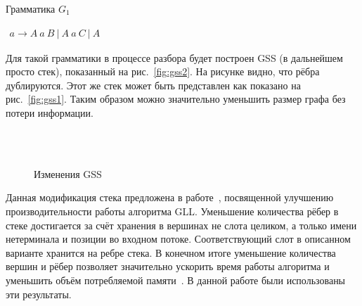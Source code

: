\begin{listing}
\caption{Грамматика $G_1$}
\label{grmG1}
\centering
$\begin{array}{rl}
a \rightarrow A \ a \ B \ | \ A \ a \ C \ | \ A
\end{array}$

\end{listing}
Для такой грамматики в процессе разбора будет построен GSS (в дальнейшем просто стек), показанный на рис.~\ref{fig:gss2}. На рисунке видно, что рёбра дублируются. Этот же стек может быть представлен как показано на рис.~\ref{fig:gss1}. Таким образом можно значительно уменьшить размер графа без потери информации. 
\begin{figure}
 \centering
    ~\\~
 \caption{Изменения GSS}
\end{figure}

Данная модификация стека предложена в работе~\cite{Afroozeh2015}, посвященной улучшению производительности работы алгоритма GLL. Уменьшение количества рёбер в стеке достигается за счёт хранения в вершинах не слота целиком, а только имени нетерминала и позиции во входном потоке. Соответствующий слот в описанном варианте хранится на ребре стека. В конечном итоге уменьшение количества вершин и рёбер позволяет значительно ускорить время работы алгоритма и уменьшить объём потребляемой памяти~\cite{Afroozeh2015}. В данной работе были использованы эти результаты.

